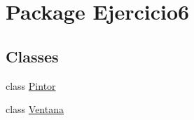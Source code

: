 \hypertarget{namespace_ejercicio6}{}\section{Package Ejercicio6}
\label{namespace_ejercicio6}
\subsection*{Classes}
\begin{DoxyCompactItemize}
\item 
class \mbox{\hyperlink{class_ejercicio6_1_1_pintor}{Pintor}}
\item 
class \mbox{\hyperlink{class_ejercicio6_1_1_ventana}{Ventana}}
\end{DoxyCompactItemize}

